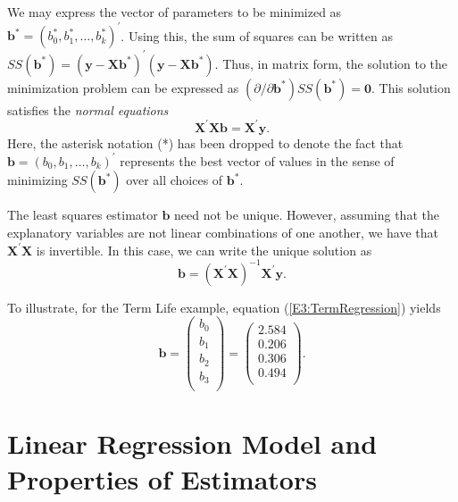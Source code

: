 We may express the vector of parameters to be minimized as
$\mathbf{b}^{\ast}=(b_0^{\ast},b_1^{\ast},\ldots,b_k^{\ast})^{\prime}$.
Using this,
the sum of squares can be written as $SS(\mathbf{b}^{\ast})=(\mathbf{y-Xb}%
^{\ast})^{\prime}(\mathbf{y-Xb}^{\ast}).$ Thus, in matrix form, the
solution to the minimization problem can be expressed as $(\partial
/\partial \mathbf{b}^{\ast})SS(\mathbf{b}^{\ast})=\mathbf{0}$. This
solution satisfies the \emph{normal equations}
\begin{equation}\label{E3:NormalEquations}
\mathbf{X^{\prime}Xb}=\mathbf{X}^{\prime}\mathbf{y}.
\end{equation}
Here, the asterisk notation (*) has been dropped to denote the fact that $%
\mathbf{b}=(b_0,b_1,\ldots,b_k)^{\prime}$ represents the best vector
of values in the
sense of minimizing $SS(\mathbf{b}^{\ast})$ over all choices of $\mathbf{b}%
^{\ast}$.

The least squares estimator $\mathbf{b}$ need not be unique.
However, assuming that the explanatory variables are not linear
combinations of one another, we have that $\mathbf{X^{\prime}X}$ is
invertible. In this case, we can write the unique solution as
\begin{equation}\label{E3:LSEstimates}
\mathbf{b}=\left( \mathbf{X^{\prime}X}\right) ^{-1}\mathbf{X}^{\prime}%
\mathbf{y}.
\end{equation}

\noindent To illustrate, for the Term Life example, equation
(\ref{E3:TermRegression}) yields
\begin{equation*}
\mathbf{b} = \left(
\begin{array}{c}
b_0 \\ b_1 \\ b_2 \\ b_3 \\
\end{array}
\right) = \left(
\begin{array}{c}
2.584 \\ 0.206 \\ 0.306 \\ 0.494 \\
\end{array}
\right).
\end{equation*}

\section{Linear Regression Model and Properties of Estimators}

